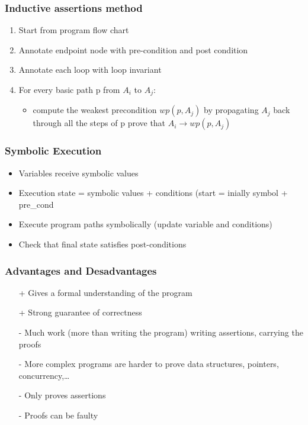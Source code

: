 \subsubsection{Inductive assertions method}
\begin{enumerate}
	\item Start from program flow chart
	\item Annotate endpoint node with pre-condition and post condition
	\item Annotate each loop with loop invariant
	\item For every basic path p from $A_i$ to $A_j$:
	\begin{itemize}
		\item compute the weakest precondition $wp(p,A_j)$ by propagating $A_j$
		back through all the steps of p prove that $A_i \rightarrow wp(p,A_j)$
	\end{itemize}
\end{enumerate}

\subsubsection{Symbolic Execution}
\begin{itemize}
	\item Variables receive symbolic values
	\item Execution state = symbolic values + conditions (start = inially symbol + pre\_cond
	\item Execute program paths symbolically (update variable and conditions)
	\item Check that final state satisfies post-conditions
\end{itemize}

\subsubsection{Advantages and Desadvantages}
\begin{itemize}
    \item[+] Gives a formal understanding of the program
    \item[+] Strong guarantee of correctness
    \item[-] Much work (more than writing the program) writing assertions, carrying the proofs
    \item[-] More complex programs are harder to prove data structures, pointers, concurrency,\ldots
    \item[-] Only proves assertions
    \item[-] Proofs can be faulty
\end{itemize}

